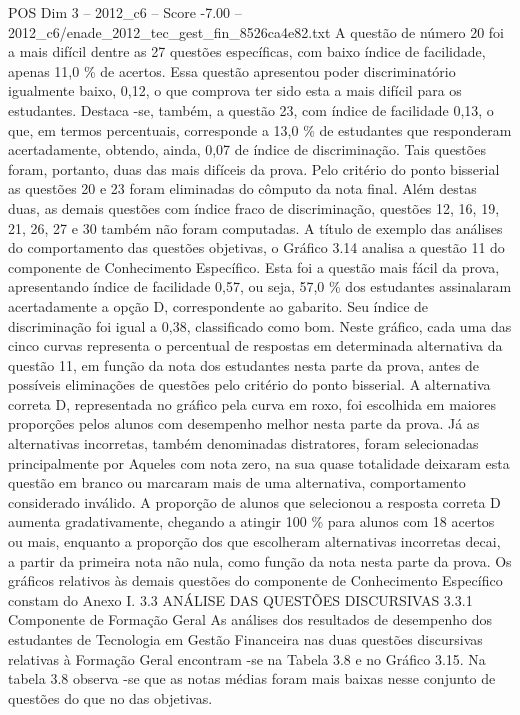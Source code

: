 \begin{textsample}{POS Dim 3 – 2012\_c6 – Score -7.00 – 2012\_c6/enade\_2012\_tec\_gest\_fin\_8526ca4e82.txt}
A questão de número 20 foi a mais difícil dentre as 27 questões específicas, com baixo índice de facilidade, apenas 11,0 \% de acertos.
Essa questão apresentou poder discriminatório igualmente baixo, 0,12, o que comprova ter sido esta a mais difícil para os estudantes.
Destaca -se, também, a questão 23, com índice de facilidade 0,13, o que, em termos percentuais, corresponde a 13,0 \% de estudantes que responderam acertadamente, obtendo, ainda, 0,07 de índice de discriminação.
Tais questões foram, portanto, duas das mais difíceis da prova.
Pelo critério do ponto bisserial as questões 20 e 23 foram eliminadas do cômputo da nota final.
Além destas duas, as demais questões com índice fraco de discriminação, questões 12, 16, 19, 21, 26, 27 e 30 também não foram computadas.
A título de exemplo das análises do comportamento das questões objetivas, o Gráfico 3.14 analisa a questão 11 do componente de Conhecimento Específico.
Esta foi a questão mais fácil da prova, apresentando índice de facilidade 0,57, ou seja, 57,0 \% dos estudantes assinalaram acertadamente a opção D, correspondente ao gabarito.
Seu índice de discriminação foi igual a 0,38, classificado como bom.
Neste gráfico, cada uma das cinco curvas representa o percentual de respostas em determinada alternativa da questão 11, em função da nota dos estudantes nesta parte da prova, antes de possíveis eliminações de questões pelo critério do ponto bisserial.
A alternativa correta D, representada no gráfico pela curva em roxo, foi escolhida em maiores proporções pelos alunos com desempenho melhor nesta parte da prova.
Já as alternativas incorretas, também denominadas distratores, foram selecionadas principalmente por Aqueles com nota zero, na sua quase totalidade deixaram esta questão em branco ou marcaram mais de uma alternativa, comportamento considerado inválido.
A proporção de alunos que selecionou a resposta correta D aumenta gradativamente, chegando a atingir 100 \% para alunos com 18 acertos ou mais, enquanto a proporção dos que escolheram alternativas incorretas decai, a partir da primeira nota não nula, como função da nota nesta parte da prova.
Os gráficos relativos às demais questões do componente de Conhecimento Específico constam do Anexo I. 3.3 ANÁLISE DAS QUESTÕES DISCURSIVAS 3.3.1 Componente de Formação Geral As análises dos resultados de desempenho dos estudantes de Tecnologia em Gestão Financeira nas duas questões discursivas relativas à Formação Geral encontram -se na Tabela 3.8 e no Gráfico 3.15.
Na tabela 3.8 observa -se que as notas médias foram mais baixas nesse conjunto de questões do que no das objetivas.

\end{textsample}
